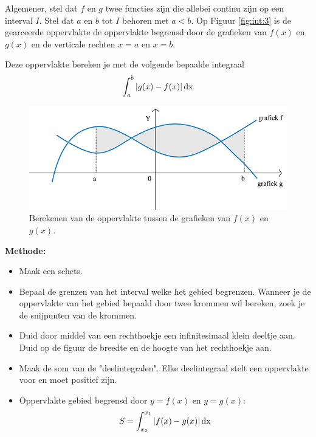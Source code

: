 \begin{voorbeeld}
\end{voorbeeld}

Algemener, stel dat $f$ en $g$ twee functies zijn die allebei continu zijn op een interval $I$. Stel dat $a$ en $b$ tot $I$ behoren met $a<b$. Op Figuur \ref{fig:int:3} is de gearceerde oppervlakte de oppervlakte begrensd door de grafieken van $f(x)$ en $g(x)$ en de verticale rechten $x=a$ en $x=b$.

Deze oppervlakte bereken je met de volgende bepaalde integraal
\begin{equation*}
\int_{a}^{b} | g(x)-f(x)| \operatorname{dx}
\end{equation*}

\begin{figure}
	\centering
	\includegraphics[width=0.7\linewidth]{6_afgeleiden_integralen/inputs/integraal3.png}
	\caption{Berekenen van de oppervlakte tussen de grafieken van $f(x)$ en $g(x)$.}
	\label{fig:integraal3}
\end{figure}

\textbf{Methode:}

\begin{itemize}
	\item Maak een schets.
	\item Bepaal de grenzen van het interval welke het gebied begrenzen. Wanneer je de oppervlakte van het gebied bepaald door twee krommen wil bereken, zoek je de snijpunten van de krommen.
	\item Duid door middel van een rechthoekje een infinitesimaal klein deeltje aan. Duid op de figuur de breedte en de hoogte van het rechthoekje aan.
	\item Maak de som van de "deelintegralen". Elke deelintegraal stelt een oppervlakte voor en moet positief zijn.
	\item Oppervlakte gebied begrensd door $y=f(x)$ en  $y=g(x)$:
	\begin{equation*}
	S=\int_{x_2}^{x_1} |f(x)-g(x)| \operatorname{dx}
	\end{equation*}
\end{itemize}



